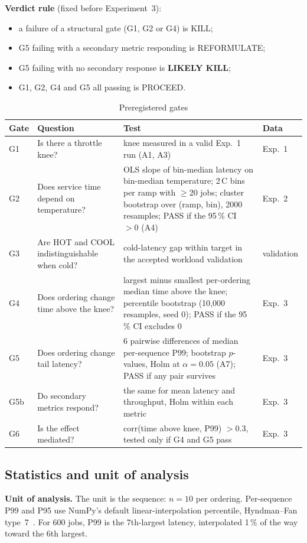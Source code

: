 \documentclass[conference,a4paper]{IEEEtran}
\newcommand{\degC}{\,\textdegree{}C}
\begin{document}
\textbf{Verdict rule} (fixed before Experiment~3):
\begin{itemize}
\item a failure of a structural gate (G1, G2 or G4) is KILL;
\item G5 failing with a secondary metric responding is REFORMULATE;
\item G5 failing with no secondary response is \textbf{LIKELY KILL};
\item G1, G2, G4 and G5 all passing is PROCEED.
\end{itemize}

\begin{table}[t]
\centering
\caption{Preregistered gates}
\label{tab:gates}
\footnotesize
\begin{tabular}{@{}l p{4.0cm} p{9.6cm} l@{}}
\toprule
Gate & Question & Test & Data\\
\midrule
G1 & Is there a throttle knee? & knee measured in a valid Exp.~1 run (A1, A3) & Exp.~1\\
G2 & Does service time depend on temperature? & OLS slope of bin-median latency on bin-median temperature; 2\degC{} bins per ramp with $\ge$20 jobs; cluster bootstrap over (ramp, bin), 2000 resamples; PASS if the 95\,\% CI $>0$ (A4) & Exp.~2\\
G3 & Are HOT and COOL indistinguishable when cold? & cold-latency gap within target in the accepted workload validation & validation\\
G4 & Does ordering change time above the knee? & largest minus smallest per-ordering median time above the knee; percentile bootstrap (10{,}000 resamples, seed 0); PASS if the 95\,\% CI excludes 0 & Exp.~3\\
G5 & Does ordering change tail latency? & 6 pairwise differences of median per-sequence P99; bootstrap $p$-values, Holm at $\alpha=0.05$ (A7); PASS if any pair survives & Exp.~3\\
G5b & Do secondary metrics respond? & the same for mean latency and throughput, Holm within each metric & Exp.~3\\
G6 & Is the effect mediated? & corr(time above knee, P99) $>0.3$, tested only if G4 and G5 pass & Exp.~3\\
\bottomrule
\end{tabular}
\end{table}

\subsection{Statistics and unit of analysis}
\textbf{Unit of analysis.} The unit is the sequence: $n=10$ per ordering. Per-sequence P99 and P95 use NumPy's
default linear-interpolation percentile, Hyndman--Fan type~7~\cite{hyndman1996}. For 600 jobs, P99 is the
7th-largest latency, interpolated 1\,\% of the way toward the 6th largest.
\end{document}
